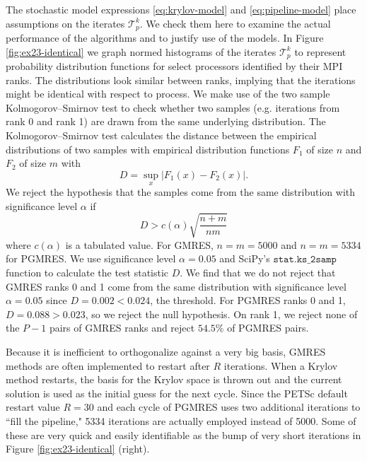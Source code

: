 \documentclass[num-refs]{wiley-article}
\begin{document}
The stochastic model expressions \eqref{eq:krylov-model} and \eqref{eq:pipeline-model} place assumptions on the iterates $\mathcal{T}^k_p$. We check them here to examine the actual performance of the algorithms and to justify use of the models. 
In Figure \ref{fig:ex23-identical} we graph normed histograms of the iterates $\mathcal{T}^k_p$ to represent probability distribution functions for select processors identified by their MPI ranks. The distributions look similar between ranks, implying that the iterations might be identical with respect to process. We make use of the two sample Kolmogorov–Smirnov test to check whether two samples (e.g. iterations from rank 0 and rank 1) are drawn from the same underlying distribution. The Kolmogorov–Smirnov test calculates the distance between the empirical distributions of two samples with empirical distribution functions $F_1$ of size $n$ and $F_2$ of size $m$ with
$$ D = \sup_x |F_1(x) - F_2(x)|. $$
We reject the hypothesis that the samples come from the same distribution with significance level $\alpha$ if 
$$D > c(\alpha)\sqrt{\frac{n + m}{nm}}$$
where $c(\alpha)$ is a tabulated value. 
For GMRES, $n = m = 5000$ and $n = m = 5334$ for PGMRES. We use significance level $\alpha = 0.05$ and SciPy's ${\texttt{stat.ks\_2samp}}$ function to calculate the test statistic $D$.  
We find that we do not reject that GMRES ranks 0 and 1 come from the same distribution with significance level $\alpha = 0.05$ since $D = 0.002 < 0.024$, the threshold. For PGMRES ranks 0 and 1, $D = 0.088 > 0.023$, so we reject the null hypothesis. 
On rank 1, we reject none of the $P-1$ pairs of GMRES ranks and reject $54.5\%$ of PGMRES pairs.

Because it is inefficient to orthogonalize against a very big basis, GMRES methods are often implemented to restart after $R$ iterations. When a Krylov method restarts, the basis for the Krylov space is thrown out and the current solution is used as the initial guess for the next cycle.
Since the PETSc default restart value $R = 30$ and each cycle of PGMRES uses two additional iterations to ``fill the pipeline," 5334 iterations are actually employed instead of 5000. Some of these are very quick and easily identifiable as the bump of very short iterations in Figure \ref{fig:ex23-identical} (right). 
\end{document}

